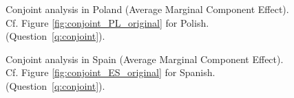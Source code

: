 \begin{figure}[h!]
    \caption[Conjoint analysis in Poland]{Conjoint analysis in Poland (Average Marginal Component Effect). Cf. Figure \ref{fig:conjoint_PL_original} for Polish. \hfill (Question~\ref{q:conjoint}).
    }\label{fig:conjoint_PL}
\end{figure}

\begin{figure}[h!]
    \caption[Conjoint analysis in Spain]{Conjoint analysis in Spain (Average Marginal Component Effect). Cf. Figure \ref{fig:conjoint_ES_original} for Spanish. \hfill (Question~\ref{q:conjoint}).
    }\label{fig:conjoint_ES}
\end{figure}

